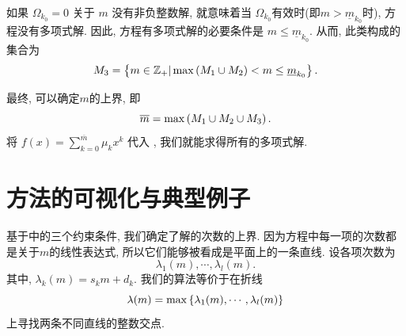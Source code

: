 如果 $\Omega_{k_0}=0$ 关于 $m$ 没有非负整数解, 就意味着当 $\Omega_{k_0}$有效时(即$m>\underline{m}_{k_0}$时), 方程没有多项式解. 因此, 方程有多项式解的必要条件是 $m\le \underline{m}_{k_0}$. 从而, 此类\BPthree{}构成的集合为 
\begin{equation}
M_3=\left\{m\in \mathbb Z_+|\max\left(M_1\cup M_2\right)<m\le \underline{m}_{k_0}\right\}. \label{BP32}
\end{equation}

最终, 可以确定$m$的上界, 即
\begin{equation}
\overline m =\max\left(M_1\cup M_2\cup M_3\right).
\end{equation}
将 $f(x)=\sum_{k=0}^{\overline m}{\mu_k x^k}$ 代入 , 我们就能求得所有的多项式解.

\section{方法的可视化与典型例子}\label{ch4sec2}
基于中的三个约束条件, 我们确定了解的次数的上界. 因为方程中每一项的次数都是关于$m$的线性表达式, 所以它们能够被看成是平面上的一条直线. 设各项次数为 
\begin{equation}
\lambda_1(m),\cdots,\lambda_l(m). \label{lines}
\end{equation}
其中, $\lambda_k(m)=s_k m+d_k$. 我们的算法等价于在折线
\begin{equation}
\lambda(m)=\max\left\{\lambda_1(m),\cdots,\lambda_l(m)\right\} \label{broken_line}
\end{equation}
上寻找两条不同直线的整数交点. 

